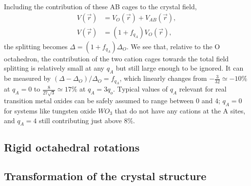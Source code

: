 \documentclass[a4paper,prb,twocolumn]{revtex4-1}  %
\newcommand{\com}[1]{}
\newcommand{\az}[1]{{\color{magenta}{#1}}} %
\begin{document}
Including the contribution of these AB cages to the crystal field,
\begin{align}
V(\vec r) &= V_{O}(\vec r) + V_{AB}(\vec r),\\
V(\vec r)  &= (1+f_{q_A}) V_{O}(\vec r),
\end{align}
the 
 splitting becomes
$\Delta = (1+f_{q_A})\Delta_O$.
We see that, relative to the O octahedron,
 the contribution of the
 two cation cages towards the total field splitting
 is relatively small at any $q_A$ but
 still large enough to be ignored.
It can be measured by $(\Delta-\Delta_O)/\Delta_O=f_{q_A}$,
which linearly changes from 
$-\frac{3}{32}\simeq -10\%$ at $q_A=0$
to $\frac{8}{27 \sqrt{3}}\simeq 17\%$ at $q_A=3q_o$. 
Typical values of $q_A$ relevant for real transition metal oxides
can be safely assumed to range between $0$ and $4$;  
$q_A=0$ for systems like tungsten oxide $WO_3$ that do not have any cations at the A sites,
and $q_A=4$ still contributing just above $8\%$. 
\az{Not just this pot, deformation induces $l=2$ V2m that can couple much more strongly.... bcs of larger D222. 
}







\subsection{Rigid octahedral rotations}
\label{sec:rotation}



\subsection{Transformation of the crystal structure}
\label{sec:structure}

\com{
Coordinates of the Oxygen atoms transform according to 
the rotation matrix $R$.
While the d-orbitals basis states attached to the octahedron transform according to
$\mathcal{R}$.
}
\az{figure vesta structure, label octahedra 1-4.}
\end{document}
